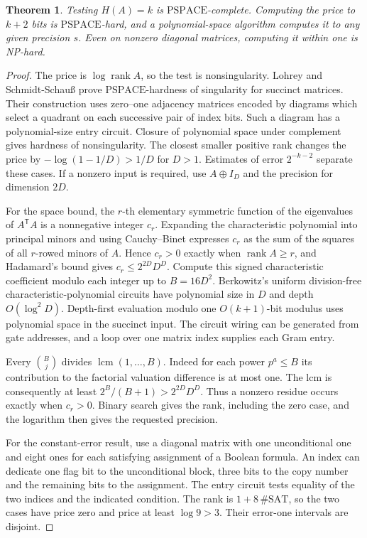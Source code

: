 \documentclass[11pt,letterpaper]{article}
\newtheorem{theorem}{Theorem}[section]
\theoremstyle{definition}
\newcommand{\PSPACE}{\mathrm{PSPACE}}
\DeclareMathOperator{\rank}{rank}
\begin{document}
\begin{theorem}\label{thm:succinct}
Testing \(H(A)=k\) is \(\PSPACE\)-complete. Computing the price to
\(k+2\) bits is \(\PSPACE\)-hard, and a polynomial-space algorithm
computes it to any given precision \(s\). Even on nonzero diagonal
matrices, computing it within one is NP-hard.
\end{theorem}
\begin{proof}
The price is \(\log\rank A\), so the test is nonsingularity.
Lohrey and Schmidt-Schau{\ss} prove \(\PSPACE\)-hardness of singularity
for succinct matrices. Their construction uses zero--one adjacency
matrices encoded by diagrams which select a quadrant on each successive
pair of index bits. Such a diagram has a polynomial-size entry circuit.
Closure of polynomial space under complement gives hardness of nonsingularity.
The closest smaller positive rank changes the price by
\(-\log(1-1/D)>1/D\) for \(D>1\). Estimates of error \(2^{-k-2}\)
separate these cases. If a nonzero input is required, use \(A\oplus I_D\)
and the precision for dimension \(2D\). \cite[\S4.2 and Theorem~6.1]{lohrey-succinct}

For the space bound, the \(r\)-th elementary symmetric function of the
eigenvalues of \(A^\mathsf{T}A\) is a nonnegative integer \(c_r\).
Expanding the characteristic polynomial into principal minors and using
Cauchy--Binet expresses \(c_r\) as the sum of the squares of all
\(r\)-rowed minors of \(A\). Hence \(c_r>0\) exactly when \(\rank A\ge r\),
and Hadamard's bound gives \(c_r\le 2^{2D}D^D\).
Compute this signed characteristic coefficient modulo each integer up to
\(B=16D^2\). Berkowitz's uniform division-free characteristic-polynomial
circuits have polynomial size in \(D\) and depth \(O(\log^2 D)\).
Depth-first evaluation modulo one \(O(k+1)\)-bit modulus uses polynomial
space in the succinct input. The circuit wiring can be generated from gate
addresses, and a loop over one matrix index supplies each Gram entry.
\cite{berkowitz-parallel}

Every \(\binom Bj\) divides \(\operatorname{lcm}(1,\ldots,B)\).
Indeed for each power \(p^a\le B\) its contribution to the factorial
valuation difference is at most one. The lcm is consequently at least
\(2^B/(B+1)>2^{2D}D^D\). Thus a nonzero residue occurs exactly when
\(c_r>0\). Binary search gives the rank, including the zero case, and
the logarithm then gives the requested precision.

For the constant-error result, use a diagonal matrix with one unconditional
one and eight ones for each satisfying assignment of a Boolean formula.
An index can dedicate one flag bit to the unconditional block, three bits
to the copy number and the remaining bits to the assignment. The entry
circuit tests equality of the two indices and the indicated condition.
The rank is \(1+8\,\#\mathrm{SAT}\), so the two cases have price zero
and price at least \(\log 9>3\). Their error-one intervals are disjoint.
\end{proof}
\end{document}
